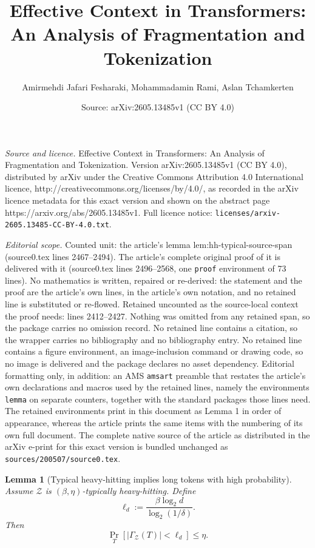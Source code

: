 \documentclass[10pt,a4paper]{amsart}
\title{Effective Context in Transformers: An Analysis of Fragmentation and Tokenization}
\author{Amirmehdi Jafari Fesharaki, Mohammadamin Rami, Aslan Tchamkerten}
\date{Source: arXiv:2605.13485v1 (CC BY 4.0)}
\newtheorem{lemma}{Lemma}
\begin{document}
\maketitle

\noindent\emph{Source and licence.} Effective Context in Transformers: An Analysis of Fragmentation and Tokenization. Version arXiv:2605.13485v1 (CC BY 4.0), distributed by arXiv under the Creative Commons Attribution 4.0 International licence, http://creativecommons.org/licenses/by/4.0/, as recorded in the arXiv licence metadata for this exact version and shown on the abstract page https://arxiv.org/abs/2605.13485v1. Full licence notice: \texttt{licenses/arxiv-2605.13485-CC-BY-4.0.txt}.\par\smallskip

\noindent\textit{Editorial scope.} Counted unit: the article's lemma lem:hh-typical-source-span (source0.tex lines 2467--2494). The article's complete original proof of it is delivered with it (source0.tex lines 2496--2568, one \texttt{proof} environment of 73 lines). No mathematics is written, repaired or re-derived: the statement and the proof are the article's own lines, in the article's own notation, and no retained line is substituted or re-flowed.  Retained uncounted as the source-local context the proof needs: lines 2412--2427.  Nothing was omitted from any retained span, so the package carries no omission record.  No retained line contains a citation, so the wrapper carries no bibliography and no bibliography entry.  No retained line contains a figure environment, an image-inclusion command or drawing code, so no image is delivered and the package declares no asset dependency.  Editorial formatting only, in addition: an AMS \texttt{amsart} preamble that restates the article's own declarations and macros used by the retained lines, namely the environments \texttt{lemma} on separate counters, together with the standard packages those lines need.  The retained environments print in this document as Lemma 1 in order of appearance, whereas the article prints the same items with the numbering of its own full document.  The complete native source of the article as distributed in the arXiv e-print for this exact version is bundled unchanged as \texttt{sources/200507/source0.tex}.
    \begin{lemma}[Typical heavy-hitting implies long tokens with high probability]
    \label{lem:hh-long-tokens}
    Assume $\mathcal Z$ is $(\beta,\eta)$-typically heavy-hitting. Define
    \[
        \ell_d
        :=
        \frac{\beta\log_2 d}{\log_2(1/\delta)}.
    \]
    Then
    \[
        \Pr_T\!\left[
            |\Gamma_{\mathcal Z}(T)|<\ell_d
        \right]
        \le \eta .
    \]
    \end{lemma}
\end{document}
